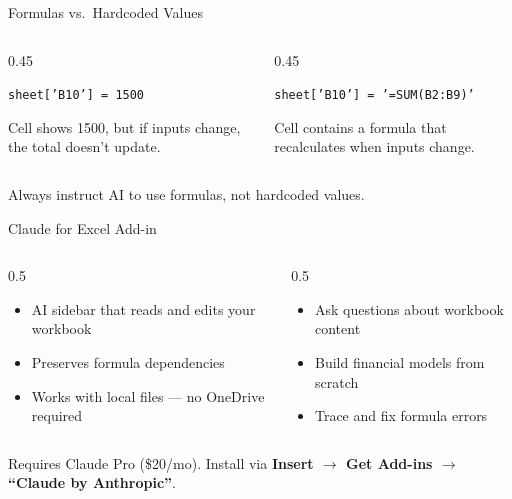 \documentclass[aspectratio=169]{beamer}
\begin{document}
\begin{frame}{Formulas vs.\ Hardcoded Values}
\begin{columns}[T]
  \begin{column}{0.45\textwidth}
\begin{shadedbox}[title=\textbf{Hardcoded (Bad)}]
\small
\texttt{sheet['B10'] = 1500}
\vspace{0.3cm}

Cell shows 1500, but if inputs change, the total doesn't update.
\end{shadedbox}
\end{column}
\begin{column}{0.45\textwidth}
\begin{shadedbox}[title=\textbf{Formula (Good)}]
\small
\texttt{sheet['B10'] = '=SUM(B2:B9)'}
\vspace{0.3cm}

Cell contains a formula that recalculates when inputs change.
\end{shadedbox}
\end{column}
\end{columns}
\vspace{0.5cm}
\centerline{\alert{Always instruct AI to use formulas, not hardcoded values.}}
\end{frame}

\begin{frame}{Claude for Excel Add-in}
\begin{columns}[T]
\begin{column}{0.5\textwidth}
\begin{shadedbox}[title=\textbf{What It Does}]
\begin{itemize}\small
  \item AI sidebar that reads and edits your workbook
  \item Preserves formula dependencies
  \item Works with local files --- \alert{no OneDrive required}
\end{itemize}
\end{shadedbox}
\end{column}
\begin{column}{0.5\textwidth}
\begin{shadedbox}[title=\textbf{Capabilities}]
\begin{itemize}\small
  \item Ask questions about workbook content
  \item Build financial models from scratch
  \item Trace and fix formula errors
\end{itemize}
\end{shadedbox}
\end{column}
\end{columns}
\vspace{0.3cm}
\begin{center}\small
Requires Claude Pro (\$20/mo). Install via \textbf{Insert $\rightarrow$ Get Add-ins $\rightarrow$ ``Claude by Anthropic''}.
\end{center}
\end{frame}
\end{document}
